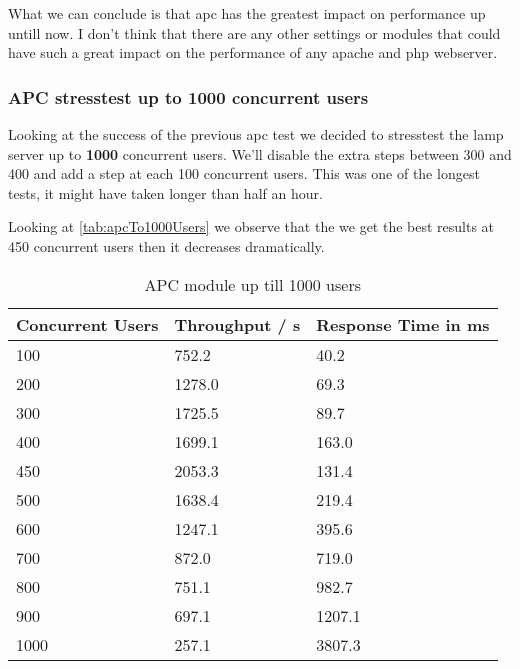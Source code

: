 What we can conclude is that \gls{apc} has the greatest impact on performance up untill now. 
I don't think that there are any other settings or modules that could have such a great impact on the performance of any \gls{apache} and \gls{php} webserver.

\clearpage{}
\subsubsection{APC stresstest up to 1000 concurrent users}
Looking at the success of the previous \gls{apc} test we decided to stresstest the \gls{lamp} server up to \textbf{1000} concurrent users.
We'll disable the extra steps between 300 and 400 and add a step at each 100 concurrent users.
This was one of the longest tests, it might have taken longer than half an hour.

Looking at \autoref{tab:apcTo1000Users} we observe that the we get the best results at 450 concurrent users then it decreases dramatically.
\begin{table}[htb!]\begin{center}
\caption{APC module up till 1000 users}\label{tab:apcTo1000Users}
\begin{tabular}{|p{2.2cm}|p{2.2cm}|p{2.2cm}|}\hline\rowcolor{myLightGreen}
 {\bf\color{white} Concurrent Users} & {\bf\color{white} Throughput / s} & {\bf\color{white} Response Time in ms} \\ \hline 
 100 & 752.2 & 40.2 \\ \hline 
 200 & 1278.0 & 69.3 \\ \hline 
 300 & 1725.5 & 89.7 \\ \hline 
 400 & 1699.1 & 163.0 \\ \hline 
 450 & 2053.3 & 131.4 \\ \hline 
 500 & 1638.4 & 219.4 \\ \hline 
 600 & 1247.1 & 395.6 \\ \hline 
 700 & 872.0 & 719.0 \\ \hline 
 800 & 751.1 & 982.7 \\ \hline 
 900 & 697.1 & 1207.1 \\ \hline 
 1000 & 257.1 & 3807.3 \\ \hline 
\end{tabular}\end{center}
\end{table}

